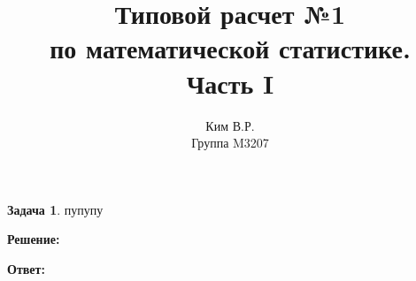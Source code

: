 \documentclass[a4paper,12pt]{article}
\title{Типовой расчет №1 \\ по математической статистике. \\ Часть I}
\author{Ким В.Р. \\ Группа M3207}
\date{}
\theoremstyle{definition}
\newtheorem{problem}{Задача}
\newenvironment{solution}
{\begin{shaded}\textbf{Решение:}\par}
{\end{shaded}}
\newenvironment{answer}
{\par\noindent\textbf{Ответ:} \color{blue}}
{\par}
\begin{document}
\maketitle

\begin{problem}
пупупу

    \begin{solution}
    \end{solution}

    \begin{answer}
    \end{answer}

\end{problem}
\end{document}
